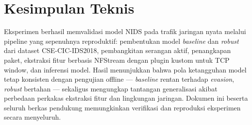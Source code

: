 \documentclass[11pt, a4paper]{article}
\begin{document}
\section{Kesimpulan Teknis}
Eksperimen berhasil memvalidasi model NIDS pada trafik jaringan nyata melalui pipeline yang sepenuhnya reproduktif: pembentukan model \textit{baseline} dan \textit{robust} dari dataset CSE-CIC-IDS2018, pembangkitan serangan aktif, penangkapan paket, ekstraksi fitur berbasis NFStream dengan plugin kustom untuk TCP window, dan inferensi model. Hasil menunjukkan bahwa pola ketangguhan model tetap konsisten dengan pengujian offline --- \textit{baseline} rentan terhadap \textit{evasion}, \textit{robust} bertahan --- sekaligus mengungkap tantangan generalisasi akibat perbedaan perkakas ekstraksi fitur dan lingkungan jaringan. Dokumen ini beserta seluruh berkas pendukung memungkinkan verifikasi dan reproduksi eksperimen secara menyeluruh.
\end{document}
